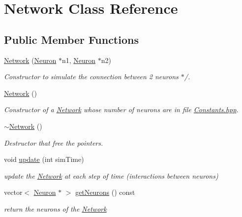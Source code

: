 \hypertarget{classNetwork}{\section{Network Class Reference}
\label{classNetwork}
}
\subsection*{Public Member Functions}
\begin{DoxyCompactItemize}
\item 
\hyperlink{classNetwork_ae9a6eb526b5fe5cd8d5ae423d430f834}{Network} (\hyperlink{classNeuron}{Neuron} $\ast$n1, \hyperlink{classNeuron}{Neuron} $\ast$n2)
\begin{DoxyCompactList}\small\item\em Constructor to simulate the connection between 2 neurons $\ast$/. \end{DoxyCompactList}\item 
\hyperlink{classNetwork_a3cc2fb4f8fa4d507077e8da85ce5a1c8}{Network} ()
\begin{DoxyCompactList}\small\item\em Constructor of a \hyperlink{classNetwork}{Network} whose number of neurons are in file \hyperlink{Constants_8hpp_source}{Constants.\-hpp}. \end{DoxyCompactList}\item 
\hyperlink{classNetwork_a7a4e19cdb4bf0c7ecf82baa643831492}{$\sim$\-Network} ()
\begin{DoxyCompactList}\small\item\em Destructor that free the pointers. \end{DoxyCompactList}\item 
void \hyperlink{classNetwork_a295749c375dcb3c16ddbc5d5f52eba86}{update} (int sim\-Time)
\begin{DoxyCompactList}\small\item\em update the \hyperlink{classNetwork}{Network} at each step of time (interactions between neurons) \end{DoxyCompactList}\item 
vector$<$ \hyperlink{classNeuron}{Neuron} $\ast$ $>$ \hyperlink{classNetwork_a8032b42ba5c9c445dcc0dd0a4916f633}{get\-Neurons} () const 
\begin{DoxyCompactList}\small\item\em return the neurons of the \hyperlink{classNetwork}{Network} \end{DoxyCompactList}\end{DoxyCompactItemize}


